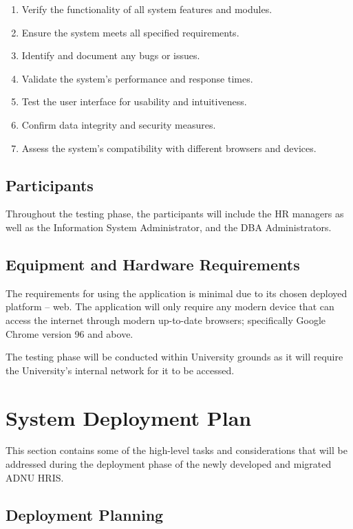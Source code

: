     \begin{enumerate}
        \item Verify the functionality of all system features and modules.
        \item Ensure the system meets all specified requirements.
        \item Identify and document any bugs or issues.
        \item Validate the system's performance and response times.
        \item Test the user interface for usability and intuitiveness.
        \item Confirm data integrity and security measures.
        \item Assess the system's compatibility with different browsers and devices.
    \end{enumerate}

    \subsection{Participants}

    Throughout the testing phase, the participants will include the HR managers as well as the Information System Administrator, and the DBA Administrators.

    \subsection{Equipment and Hardware Requirements}

    The requirements for using the application is minimal due to its chosen deployed platform -- web. The application will only require any modern device that can access the internet through modern up-to-date browsers; specifically Google Chrome version 96 and above. 
    
    The testing phase will be conducted within University grounds as it will require the University's internal network for it to be accessed. 

\section{System Deployment Plan}

This section contains some of the high-level tasks and considerations that will be addressed during the deployment phase of the newly developed and migrated ADNU HRIS.

    \subsection{Deployment Planning}
        
